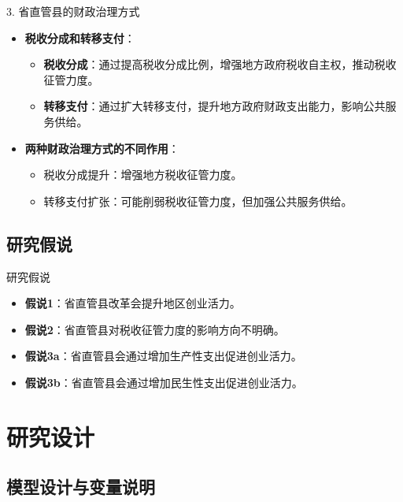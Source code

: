 \documentclass{beamer}
\newcommand{\tightlist}{%
  \setlength{\itemsep}{0pt}\setlength{\parskip}{0pt}}
\begin{document}
\begin{frame}{3. 省直管县的财政治理方式}
\begin{itemize}
\tightlist
\item
  \textbf{税收分成和转移支付}：

  \begin{itemize}
  \tightlist
  \item
    \textbf{税收分成}：通过提高税收分成比例，增强地方政府税收自主权，推动税收征管力度。
  \item
    \textbf{转移支付}：通过扩大转移支付，提升地方政府财政支出能力，影响公共服务供给。
  \end{itemize}
\item
  \textbf{两种财政治理方式的不同作用}：

  \begin{itemize}
  \tightlist
  \item
    税收分成提升：增强地方税收征管力度。
  \item
    转移支付扩张：可能削弱税收征管力度，但加强公共服务供给。
  \end{itemize}
\end{itemize}
\end{frame}

\subsection{研究假说}\label{ux7814ux7a76ux5047ux8bf4}

\begin{frame}{研究假说}
\begin{itemize}
\tightlist
\item
  \textbf{假说1}：省直管县改革会提升地区创业活力。
\item
  \textbf{假说2}：省直管县对税收征管力度的影响方向不明确。
\item
  \textbf{假说3a}：省直管县会通过增加生产性支出促进创业活力。
\item
  \textbf{假说3b}：省直管县会通过增加民生性支出促进创业活力。
\end{itemize}
\end{frame}

\section{研究设计}\label{ux7814ux7a76ux8bbeux8ba1}

\subsection{模型设计与变量说明}\label{ux6a21ux578bux8bbeux8ba1ux4e0eux53d8ux91cfux8bf4ux660e}
\end{document}
